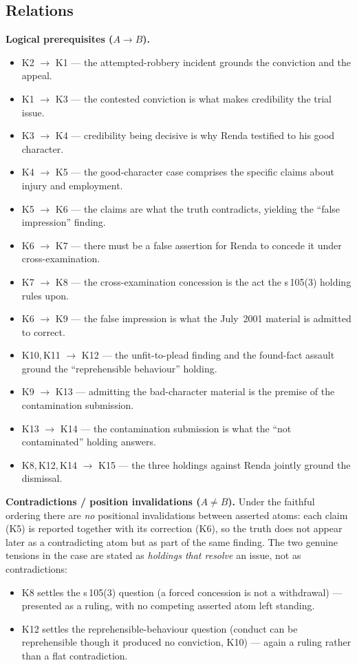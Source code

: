 \documentclass[11pt]{article}
\begin{document}
\subsection*{Relations}

\textbf{Logical prerequisites ($A \rightarrow B$).}
\begin{itemize}[leftmargin=*]
  \item K2 $\rightarrow$ K1 --- the attempted-robbery incident grounds the conviction and the appeal.
  \item K1 $\rightarrow$ K3 --- the contested conviction is what makes credibility the trial issue.
  \item K3 $\rightarrow$ K4 --- credibility being decisive is why Renda testified to his good character.
  \item K4 $\rightarrow$ K5 --- the good-character case comprises the specific claims about injury and employment.
  \item K5 $\rightarrow$ K6 --- the claims are what the truth contradicts, yielding the ``false impression'' finding.
  \item K6 $\rightarrow$ K7 --- there must be a false assertion for Renda to concede it under cross-examination.
  \item K7 $\rightarrow$ K8 --- the cross-examination concession is the act the s\,105(3) holding rules upon.
  \item K6 $\rightarrow$ K9 --- the false impression is what the July~2001 material is admitted to correct.
  \item K10,\,K11 $\rightarrow$ K12 --- the unfit-to-plead finding and the found-fact assault ground the ``reprehensible behaviour'' holding.
  \item K9 $\rightarrow$ K13 --- admitting the bad-character material is the premise of the contamination submission.
  \item K13 $\rightarrow$ K14 --- the contamination submission is what the ``not contaminated'' holding answers.
  \item K8,\,K12,\,K14 $\rightarrow$ K15 --- the three holdings against Renda jointly ground the dismissal.
\end{itemize}

\noindent
\textbf{Contradictions / position invalidations ($A \neq B$).} Under the faithful
ordering there are \emph{no} positional invalidations between asserted atoms:
each claim (K5) is reported together with its correction (K6), so the truth does
not appear later as a contradicting atom but as part of the same finding. The two
genuine tensions in the case are stated as \emph{holdings that resolve} an issue,
not as contradictions:
\begin{itemize}[leftmargin=*]
  \item K8 settles the s\,105(3) question (a forced concession is not a withdrawal) --- presented as a ruling, with no competing asserted atom left standing.
  \item K12 settles the reprehensible-behaviour question (conduct can be reprehensible though it produced no conviction, K10) --- again a ruling rather than a flat contradiction.
\end{itemize}
\end{document}
